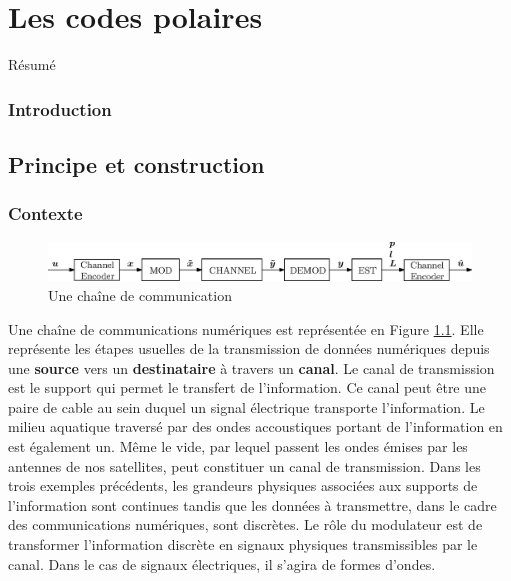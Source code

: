 
\chapter{Les codes polaires}

Résumé

\vspace*{\fill}
\minitocTITI
\vspace*{\fill}

\subsection*{Introduction}

\section{Principe et construction}

\subsection{Contexte}



\begin{figure}[t]
\includegraphics{main/ch1_fig/chaine_com2}
\caption{Une chaîne de communication}
\label{fig:chaine_com}
\end{figure}
Une chaîne de communications numériques est représentée en Figure \ref{fig:chaine_com}.
Elle représente les étapes usuelles de la transmission de données numériques depuis une \textbf{source} vers un \textbf{destinataire} à travers un \textbf{canal}.
Le canal de transmission est le support qui permet le transfert de l'information. Ce canal peut être une paire de cable au sein duquel un signal électrique transporte l'information. Le milieu aquatique traversé par des ondes accoustiques portant de l'information en est également un. Même le vide, par lequel passent les ondes émises par les antennes de nos satellites, peut constituer un canal de transmission.
Dans les trois exemples précédents, les grandeurs physiques associées aux supports de l'information sont continues tandis que les données à transmettre, dans le cadre des communications numériques, sont discrètes. Le rôle du modulateur est de transformer l'information discrète en signaux physiques transmissibles par le canal. Dans le cas de signaux électriques, il s'agira de formes d'ondes. 

